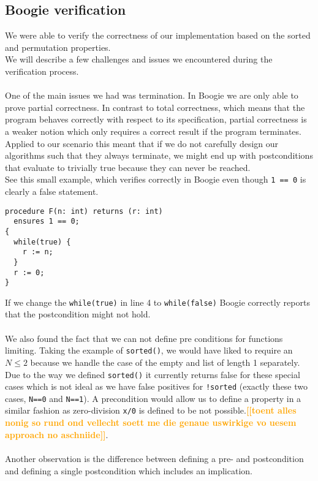 \documentclass{report}
\newcommand{\todo}[1]{\textsf{\textbf{\textcolor{orange}{[[#1]]}}}}
\begin{document}
\subsection{Boogie verification}
\label{s:boogie_verification}
We were able to verify the correctness of our implementation based on the sorted and permutation properties.\\
We will describe a few challenges and issues we encountered during the verification process.
\\\\
One of the main issues we had was termination. In Boogie we are only able to prove partial correctness. In contrast to total correctness, which means that the program behaves correctly with respect to its specification, partial correctness is a weaker notion which only requires a correct result if the program terminates.\\
Applied to our scenario this meant that if we do not carefully design our algorithms such that they always terminate, we might end up with postconditions that evaluate to trivially true because they can never be reached.\\
See this small example, which verifies correctly in Boogie even though \texttt{1 == 0} is clearly a false statement.
\begin{lstlisting}
procedure F(n: int) returns (r: int)
  ensures 1 == 0;
{
  while(true) {
    r := n;
  }
  r := 0;
}
\end{lstlisting}
If we change the \texttt{while(true)} in line 4 to \texttt{while(false)} Boogie correctly reports that the postcondition might not hold.
\\\\
We also found the fact that we can not define pre conditions for functions limiting. Taking the example of \texttt{sorted()}, we would have liked to require an $N \leq 2$ because we handle the case of the empty and list of length 1 separately. Due to the way we defined \texttt{sorted()} it currently returns false for these special cases which is not ideal as we have false positives for \texttt{!sorted} (exactly these two cases, \texttt{N==0} and \texttt{N==1}). A precondition would allow us to define a property in a similar fashion as zero-division \texttt{x/0} is defined to be not possible.\todo{toent alles nonig so rund ond vellecht soett me die genaue uswirkige vo uesem approach no aschniide}.
\\\\
Another observation is the difference between defining a pre- and postcondition and defining a single postcondition which includes an implication.
\end{document}
